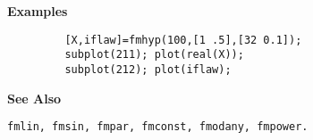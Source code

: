 {\bf \large \sf Examples}
\begin{verbatim}
         [X,iflaw]=fmhyp(100,[1 .5],[32 0.1]); 
         subplot(211); plot(real(X));
         subplot(212); plot(iflaw);
\end{verbatim}
\vspace*{.5cm}


{\bf \large \sf See Also}\\
\hspace*{1.5cm}
\begin{minipage}[t]{13.5cm}
\begin{verbatim}
fmlin, fmsin, fmpar, fmconst, fmodany, fmpower.
\end{verbatim}
\end{minipage}


